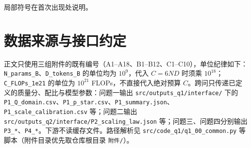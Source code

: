 局部符号在首次出现处说明。

\section{数据来源与接口约定}
\label{sec:5.1}

正文只使用三组附件的既有编号（A1–A18、B1–B12、C1–C10），单位纪律如下：\texttt{N\_params\_B}、\texttt{D\_tokens\_B} 的单位均为 $10^9$，代入 $C=6ND$ 时须乘 $10^{18}$；\texttt{C\_FLOPs\_1e21} 的单位为 $10^{21}$ FLOPs，不直接代入绝对预算 $C$。跨问只传递已定义的质量分、配比与模型参数：问题一输出 \texttt{src/outputs\_q1/interface/} 下的 \texttt{P1\_Q\_domain.csv}、\texttt{P1\_p\_star.csv}、\texttt{P1\_summary.json}、\texttt{P1\_scale\_calibration.csv} 等；问题二输出 \texttt{src/outputs\_q2/interface/P2\_scaling\_law.json} 等；问题三、问题四分别输出 \texttt{P3\_*}、\texttt{P4\_*}。下游不读缓存文件。路径解析见 \texttt{src/code\_q1/q1\_00\_common.py} 等脚本（附件目录优先取仓库根目录 \texttt{附件/}）。
